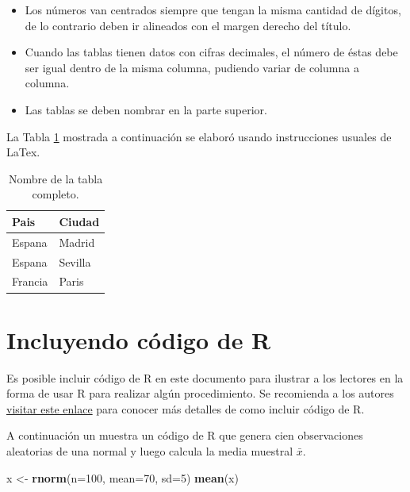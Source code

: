 \documentclass[]{article}
\newenvironment{Shaded}{\begin{snugshade}}{\end{snugshade}}
\newcommand{\DataTypeTok}[1]{\textcolor[rgb]{0.13,0.29,0.53}{#1}}
\newcommand{\DecValTok}[1]{\textcolor[rgb]{0.00,0.00,0.81}{#1}}
\newcommand{\KeywordTok}[1]{\textcolor[rgb]{0.13,0.29,0.53}{\textbf{#1}}}
\newcommand{\NormalTok}[1]{#1}
\newcommand{\StringTok}[1]{\textcolor[rgb]{0.31,0.60,0.02}{#1}}
\providecommand{\tightlist}{%
\setlength{\itemsep}{0pt}\setlength{\parskip}{0pt}}
\begin{document}
\begin{itemize}
\tightlist
\item
  Los números van centrados siempre que tengan la misma cantidad de
  dígitos, de lo contrario deben ir alineados con el margen derecho del
  título.
\item
  Cuando las tablas tienen datos con cifras decimales, el número de
  éstas debe ser igual dentro de la misma columna, pudiendo variar de
  columna a columna.
\item
  Las tablas se deben nombrar en la parte superior.
\end{itemize}

La Tabla \ref{tabla:sencilla} mostrada a continuación se elaboró usando
instrucciones usuales de LaTex.

\begin{table}[htbp]
\begin{center}
\caption{Nombre de la tabla completo.}
\begin{tabular}{l|l} \hline
Pais & Ciudad \\ \hline
Espana & Madrid \\ 
Espana & Sevilla \\ 
Francia & Paris \\ \hline
\end{tabular}
\label{tabla:sencilla}
\end{center}
\end{table}

\hypertarget{incluyendo-codigo-de-r}{%
\section{Incluyendo código de R}\label{incluyendo-codigo-de-r}}

Es posible incluir código de R en este documento para ilustrar a los
lectores en la forma de usar R para realizar algún procedimiento. Se
recomienda a los autores
\href{https://bookdown.org/yihui/rmarkdown/r-code.html}{visitar este
enlace} para conocer más detalles de como incluir código de R. \newline

A continuación un muestra un código de R que genera cien observaciones
aleatorias de una normal y luego calcula la media muestral \(\bar{x}\).

\begin{Shaded}
\begin{Highlighting}[]
\NormalTok{x <-}\StringTok{ }\KeywordTok{rnorm}\NormalTok{(}\DataTypeTok{n=}\DecValTok{100}\NormalTok{, }\DataTypeTok{mean=}\DecValTok{70}\NormalTok{, }\DataTypeTok{sd=}\DecValTok{5}\NormalTok{)}
\KeywordTok{mean}\NormalTok{(x)}
\end{Highlighting}
\end{Shaded}
\end{document}
